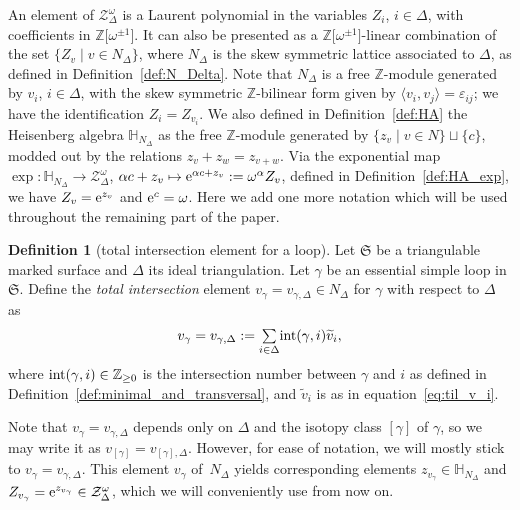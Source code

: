 \documentclass[pdftex]{sigma}
\numberwithin{equation}{section}
\theoremstyle{definition}
\newtheorem{Definition}[Theorem]{Definition}
\newcommand{\til}[1]{\widetilde{#1}}
\begin{document}
An element of $\mathcal{Z}^\omega_\Delta$ is a Laurent polynomial in the variables $Z_i$, $i\in \Delta$, with coefficients in $\mathbb{Z}\bigl[\omega^{\pm 1}\bigr]$. It can also be presented as a $\mathbb{Z}\bigl[\omega^{\pm 1}\bigr]$-linear combination of the set $\{Z_v \mid v\in N_\Delta\}$, where $N_\Delta$ is the skew symmetric lattice associated to $\Delta$, as defined in Definition~\ref{def:N_Delta}. Note that $N_\Delta$ is a free $\mathbb{Z}$-module generated by $v_i$, $i\in \Delta$, with the skew symmetric $\mathbb{Z}$-bilinear form given by $\langle v_i,v_j\rangle = \varepsilon_{ij}$; we have the identification $Z_i = Z_{v_i}$. We also defined in Definition~\ref{def:HA} the Heisenberg algebra $\mathbb{H}_{N_\Delta}$ as the free $\mathbb{Z}$-module generated by $\{z_v \mid v\in N\} \sqcup\{c\}$, modded out by the relations $z_v + z_w = z_{v+w}$. Via the exponential map $\exp \colon \mathbb{H}_{N_\Delta} \to \mathcal{Z}^\omega_\Delta$, $\alpha c + z_v \mapsto {\rm e}^{\alpha c + z_v} := \omega^\alpha Z_v$, defined in Definition~\ref{def:HA_exp}, we have $Z_v = {\rm e}^{z_v}$ and ${\rm e}^c = \omega$.
Here we add one more notation which will be used throughout the remaining part of the paper.
\begin{Definition}[total intersection element for a loop]
\label{def:v_gamma}
Let $\mathfrak{S}$ be a triangulable marked surface and $\Delta$ its ideal triangulation. Let $\gamma$ be an essential simple loop in $\mathfrak{S}$. Define the {\em total intersection} element $v_\gamma = v_{\gamma,\Delta} \in N_\Delta$ for $\gamma$ with respect to $\Delta$ as
\[
v_\gamma = v_{\gamma,\Delta} := \underset{i\in \Delta}{\textstyle \sum} {\rm int}(\gamma,i) \til{v}_i,
\]
where ${\rm int}(\gamma,i) \in \mathbb{Z}_{\ge 0}$ is the intersection number between $\gamma$ and $i$ as defined in Definition~\ref{def:minimal_and_transversal}, and $\til{v}_i$ is as in equation~\eqref{eq:til_v_i}.
\end{Definition}
Note that $v_\gamma = v_{\gamma,\Delta}$ depends only on $\Delta$ and the isotopy class $[\gamma]$ of $\gamma$, so we may write it as $v_{[\gamma]} = v_{[\gamma],\Delta}$. However, for ease of notation, we will mostly stick to $v_\gamma = v_{\gamma,\Delta}$. This element $v_\gamma$ of~$N_\Delta$ yields corresponding elements $z_{v_\gamma} \in \mathbb{H}_{N_\Delta}$ and $Z_{v_\gamma} = {\rm e}^{z_{v_\gamma}} \in \mathcal{Z}^\omega_\Delta$, which we will conveniently use from now on.
\end{document}
